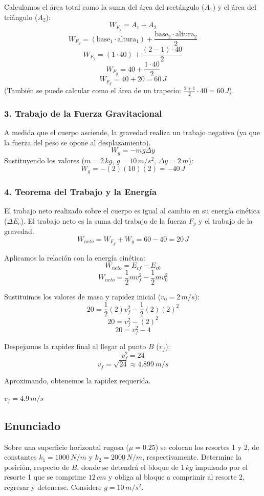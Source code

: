 \documentclass[12pt, a4paper]{article}
\begin{document}
Calculamos el área total como la suma del área del rectángulo ($A_1$) y el área del triángulo ($A_2$):
$$ W_{F_y} = A_1 + A_2 $$
$$ W_{F_y} = (\text{base}_1 \cdot \text{altura}_1) + \frac{\text{base}_2 \cdot \text{altura}_2}{2} $$
$$ W_{F_y} = (1 \cdot 40) + \frac{(2 - 1) \cdot 40}{2} $$
$$ W_{F_y} = 40 + \frac{1 \cdot 40}{2} $$
$$ W_{F_y} = 40 + 20 = 60 \, \si{J} $$
(También se puede calcular como el área de un trapecio: $\frac{2+1}{2} \cdot 40 = 60 \, \si{J}$).

\subsubsection*{3. Trabajo de la Fuerza Gravitacional}
A medida que el cuerpo asciende, la gravedad realiza un trabajo negativo (ya que la fuerza del peso se opone al desplazamiento).
$$ W_g = -mg \Delta y $$
Sustituyendo los valores ($m = 2 \, \si{kg}$, $g = 10 \, \si{m/s^2}$, $\Delta y = 2 \, \si{m}$):
$$ W_g = -(2)(10)(2) = -40 \, \si{J} $$

\subsubsection*{4. Teorema del Trabajo y la Energía}
El trabajo neto realizado sobre el cuerpo es igual al cambio en su energía cinética ($\Delta E_c$). El trabajo neto es la suma del trabajo de la fuerza $F_y$ y el trabajo de la gravedad.
$$ W_{neto} = W_{F_y} + W_g = 60 - 40 = 20 \, \si{J} $$

Aplicamos la relación con la energía cinética:
$$ W_{neto} = E_{cf} - E_{c0} $$
$$ W_{neto} = \frac{1}{2} m v_f^2 - \frac{1}{2} m v_0^2 $$

Sustituimos los valores de masa y rapidez inicial ($v_0 = 2 \, \si{m/s}$):
$$ 20 = \frac{1}{2} (2) v_f^2 - \frac{1}{2} (2) (2)^2 $$
$$ 20 = v_f^2 - (2)^2 $$
$$ 20 = v_f^2 - 4 $$

Despejamos la rapidez final al llegar al punto $B$ ($v_f$):
$$ v_f^2 = 24 $$
$$ v_f = \sqrt{24} \approx 4.899 \, \si{m/s} $$

Aproximando, obtenemos la rapidez requerida.

\begin{tcolorbox}[colback=green!5!white, colframe=green!50!black, title=Respuesta Final]
\centering \Large $v_f = 4.9 \, \si{m/s}$
\end{tcolorbox}

\newpage

\subsection*{Enunciado}
Sobre una superficie horizontal rugosa ($\mu = 0.25$) se colocan los resortes 1 y 2, de constantes $k_1 = 1000 \, \si{N/m}$ y $k_2 = 2000 \, \si{N/m}$, respectivamente. Determine la posición, respecto de $B$, donde se detendrá el bloque de $1 \, \si{kg}$ impulsado por el resorte 1 que se comprime $12 \, \si{cm}$ y obliga al bloque a comprimir al resorte 2, regresar y detenerse. Considere $g = 10 \, \si{m/s^2}$.
\end{document}

